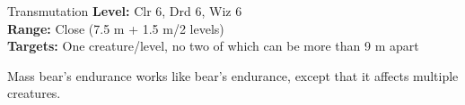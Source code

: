 {Transmutation}
{
	\textbf{Level:}
	Clr 6, Drd 6, Wiz 6\\
	\textbf{Range:}
	Close (7.5 m + 1.5 m/2 levels)\\
	\textbf{Targets:}
	One creature/level, no two of which can be more than 9 m apart\\
}
{
	Mass bear's endurance works like bear's endurance, except that it affects multiple creatures.

}
